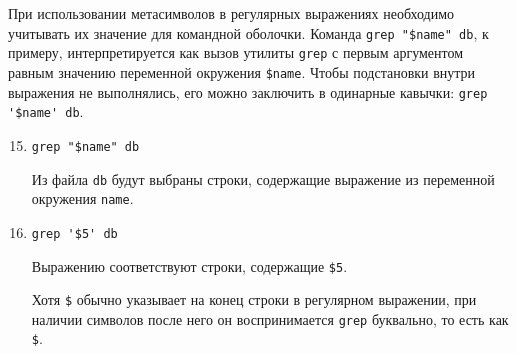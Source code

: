\documentclass[listings]{labreport}
\begin{document}
При использовании метасимволов в регулярных выражениях необходимо учитывать их значение для командной оболочки.
Команда \verb|grep "$name" db|, к примеру, интерпретируется как вызов утилиты \texttt{grep} с первым аргументом
равным значению переменной окружения \verb|$name|. Чтобы подстановки внутри выражения не выполнялись, его можно
заключить в одинарные кавычки: \verb|grep '$name' db|.

\begin{enumerate}
\setcounter{enumi}{14}

\item \verb|grep "$name" db|

Из файла \texttt{db} будут выбраны строки, содержащие выражение из переменной окружения \verb|name|.

\item \verb|grep '$5' db|

Выражению соответствуют строки, содержащие \verb|$5|.

\begin{small}
Хотя \verb|$| обычно указывает на конец строки в регулярном выражении, при наличии символов после него он
воспринимается \texttt{grep} буквально, то есть как \verb|$|. 
\end{small}
\end{enumerate}
\end{document}
